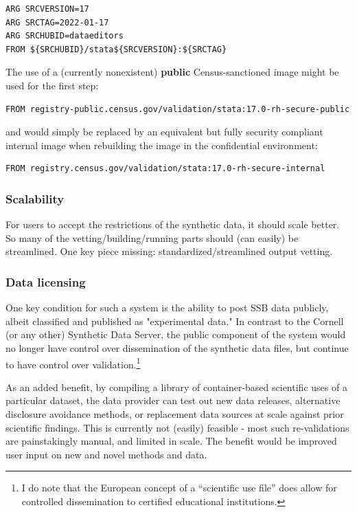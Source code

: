 \documentclass{article}
\begin{document}
\begin{lstlisting}[language=docker]
ARG SRCVERSION=17
ARG SRCTAG=2022-01-17
ARG SRCHUBID=dataeditors
FROM ${SRCHUBID}/stata${SRCVERSION}:${SRCTAG}
\end{lstlisting}

The use of a  (currently nonexistent) \textbf{public}  Census-sanctioned image might be used for the first step:

\begin{lstlisting}[language=docker]
FROM registry-public.census.gov/validation/stata:17.0-rh-secure-public
\end{lstlisting}

and would simply be replaced by an equivalent but fully security compliant internal image when rebuilding the image in the confidential environment:

\begin{lstlisting}[language=docker]
FROM registry.census.gov/validation/stata:17.0-rh-secure-internal
\end{lstlisting}



\subsubsection{Scalability}

For users to accept the restrictions of the synthetic data, it should scale better. So many of the vetting/building/running parts should (can easily) be streamlined. One key piece missing: standardized/streamlined output vetting.

\subsubsection{Data licensing}

One key condition for such a system is the ability to post SSB data publicly, albeit  classified and published as "experimental data." In contrast to the Cornell (or any other) Synthetic Data Server, the public component of the system would no longer have control over dissemination of the synthetic data files, but continue to have control over validation.\footnote{I do note that the European concept of a ``scientific use file'' does allow for controlled dissemination to certified educational institutions.}

As an added benefit, by compiling a library of container-based scientific uses of a particular dataset, the data provider can test out new data releases, alternative disclosure avoidance methods, or replacement data sources  at scale against prior scientific findings. This is currently not (easily) feasible - most such re-validations are painstakingly manual, and limited in scale. The benefit would be improved user input on new and novel methods and data.
\end{document}
